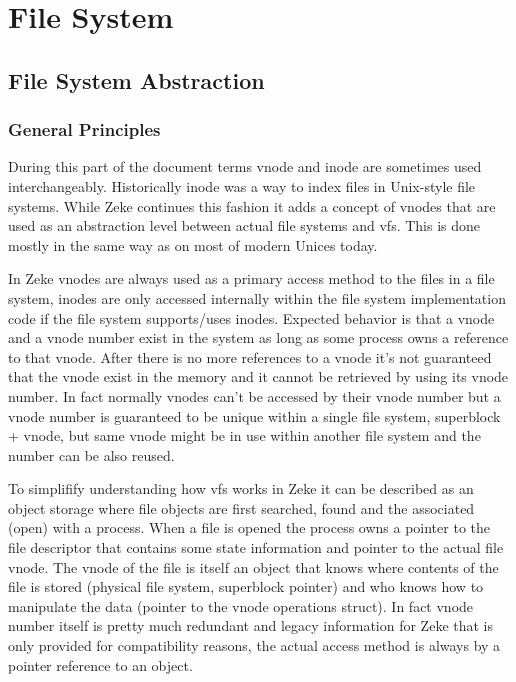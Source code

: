 \part{File System}

\chapter{File System Abstraction}

\section{General Principles}

During this part of the document terms \acs{vnode} and \acs{inode} are
sometimes used interchangeably. Historically inode was a way to index files
in Unix-style file systems.\cite{Wikipedia:inode} While Zeke continues this
fashion it adds a concept of vnodes that are used as an abstraction level
between actual file systems and \acf{vfs}. This is done mostly in the same way
as on most of modern Unices today.

In Zeke vnodes are always used as a primary access method to the files in
a file system, inodes are only accessed internally within the file system
implementation code if the file system supports/uses inodes. Expected behavior
is that a vnode and a vnode number exist in the system as long as some process
owns a reference to that vnode. After there is no more references to a vnode
it's not guaranteed that the vnode exist in the memory and it cannot be
retrieved by using its vnode number. In fact normally vnodes can't be accessed
by their vnode number but a vnode number is guaranteed to be unique within
a single file system, superblock + vnode, but same vnode might be in use within
another file system and the number can be also reused.

To simplifify understanding how \acs{vfs} works in Zeke it can be described as
an object storage where file objects are first searched, found and the
associated (open) with a process. When a file is opened the process owns a
pointer to the file descriptor that contains some state information and pointer
to the actual file vnode. The vnode of the file is itself an object that knows
where contents of the file is stored (physical file system, superblock pointer)
and who knows how to manipulate the data (pointer to the vnode operations struct).
In fact vnode number itself is pretty much redundant and legacy information for
Zeke that is only provided for compatibility reasons, the actual access method
is always by a pointer reference to an object.

